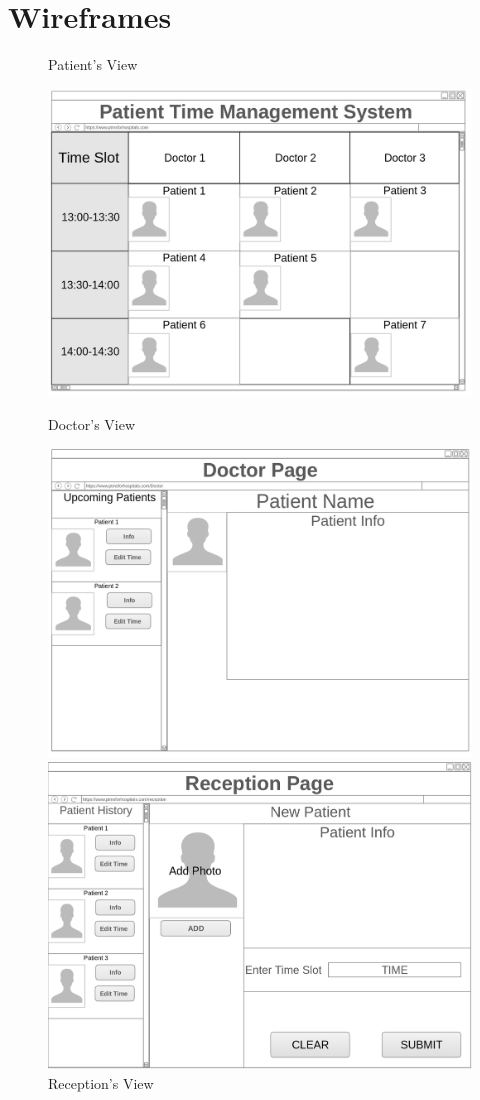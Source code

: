 \newpage
\section*{Wireframes}
\begin{figure}[h]

\caption*{Patient's View}
\centering
\includegraphics[scale=0.11]{patient.png}
\vspace{3.5mm}
\caption*{Doctor's View}
\centering
\includegraphics[scale=0.11]{doctor.png}
\vspace{3.5mm}
	\caption*{Reception's View}
	\includegraphics[scale=0.11]{reception.png}
	\centering

\end{figure}
